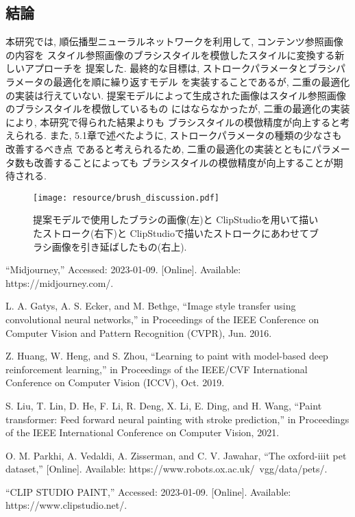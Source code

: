 \documentclass[MIRU,submit,uplatex]{miru2023j}
\begin{document}
\subsection{結論}
本研究では, 順伝播型ニューラルネットワークを利用して, コンテンツ参照画像の内容を
スタイル参照画像のブラシスタイルを模倣したスタイルに変換する新しいアプローチを
提案した.
最終的な目標は, ストロークパラメータとブラシパラメータの最適化を順に繰り返すモデル
を実装することであるが, 二重の最適化の実装は行えていない.
提案モデルによって生成された画像はスタイル参照画像のブラシスタイルを模倣しているもの
にはならなかったが, 二重の最適化の実装により, 本研究で得られた結果よりも
ブラシスタイルの模倣精度が向上すると考えられる.
また, 5.1章で述べたように, ストロークパラメータの種類の少なさも改善するべき点
であると考えられるため, 二重の最適化の実装とともにパラメータ数も改善することによっても
ブラシスタイルの模倣精度が向上することが期待される. 

\begin{figure}[t]
    \centering
    \texttt{[image: resource/brush\_discussion.pdf]}
    \caption{提案モデルで使用したブラシの画像(左)と
    ClipStudioを用いて描いたストローク(右下)と
    ClipStudioで描いたストロークにあわせてブラシ画像を引き延ばしたもの(右上).}
    \label{fig:discussion}
\end{figure}
%




\begin{thebibliography}{9}%
“Midjourney,” Accessed: 2023-01-09. [Online]. Available: https://midjourney.com/.

L. A. Gatys, A. S. Ecker, and M. Bethge, “Image style transfer using
convolutional neural networks,” in Proceedings of the IEEE Conference
on Computer Vision and Pattern Recognition (CVPR), Jun. 2016.

Z. Huang, W. Heng, and S. Zhou, “Learning to paint with model-based
deep reinforcement learning,” in Proceedings of the IEEE/CVF International 
Conference on Computer Vision (ICCV), Oct. 2019.

S. Liu, T. Lin, D. He, F. Li, R. Deng, X. Li, E. Ding, and H. Wang,
“Paint transformer: Feed forward neural painting with stroke prediction,”
in Proceedings of the IEEE International Conference on Computer Vision, 2021.

O. M. Parkhi, A. Vedaldi, A. Zisserman, and C. V. Jawahar, “The
oxford-iiit pet dataset,” [Online]. Available: https://www.robots.ox.ac.uk/~vgg/data/pets/.

“CLIP STUDIO PAINT,” Accessed: 2023-01-09. [Online]. Available: https://www.clipstudio.net/.


\end{thebibliography}
\end{document}
